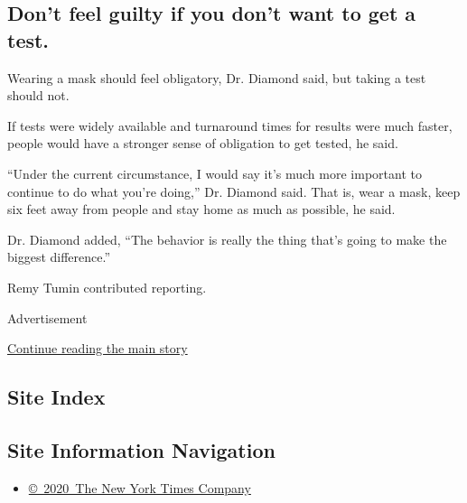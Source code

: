 \hypertarget{dont-feel-guilty-if-you-dont-want-to-get-a-test}{%
\subsection{Don't feel guilty if you don't want to get a
test.}\label{dont-feel-guilty-if-you-dont-want-to-get-a-test}}

Wearing a mask should feel obligatory, Dr. Diamond said, but taking a
test should not.

If tests were widely available and turnaround times for results were
much faster, people would have a stronger sense of obligation to get
tested, he said.

``Under the current circumstance, I would say it's much more important
to continue to do what you're doing,'' Dr. Diamond said. That is, wear a
mask, keep six feet away from people and stay home as much as possible,
he said.

Dr. Diamond added, ``The behavior is really the thing that's going to
make the biggest difference.''

Remy Tumin contributed reporting.

Advertisement

\protect\hyperlink{after-bottom}{Continue reading the main story}

\hypertarget{site-index}{%
\subsection{Site Index}\label{site-index}}

\hypertarget{site-information-navigation}{%
\subsection{Site Information
Navigation}\label{site-information-navigation}}

\begin{itemize}
\tightlist
\item
  \href{https://help.nytimes.com/hc/en-us/articles/115014792127-Copyright-notice}{©~2020~The
  New York Times Company}
\end{itemize}


